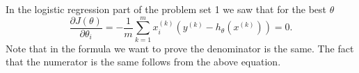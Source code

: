 \begin{answer}
In the logistic regression part of the problem set 1 we saw that for the best $\theta$
$$\frac{\partial J(\theta)}{\partial \theta_i} = - \frac{1}{m}\sum_{k = 1}^{m }x_i^{(k)}( y^{(k)} - h_{\theta}(x^{(k)})) = 0.$$
Note that in the formula we want to prove the denominator is the same. The fact that the numerator is the same follows from
the above equation.
\end{answer}
